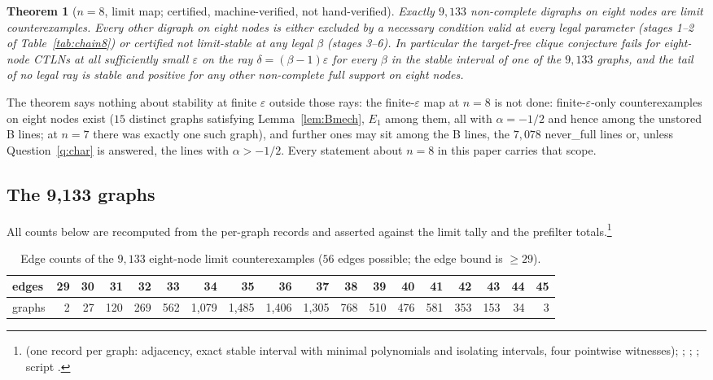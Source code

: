 \documentclass[11pt]{article}
\newtheorem{theorem}{Theorem}[section]
\theoremstyle{definition}
\newcommand{\eps}{\varepsilon}
\begin{document}
\begin{theorem}[$n=8$, limit map; certified, machine-verified, not hand-verified]\label{thm:n8}
Exactly $9{,}133$ non-complete digraphs on eight nodes are limit counterexamples. Every other digraph on eight nodes is
either excluded by a necessary condition valid at every legal parameter (stages 1--2 of Table~\ref{tab:chain8}) or
certified not limit-stable at any legal $\beta$ (stages 3--6). In particular the target-free clique conjecture fails for
eight-node CTLNs at all sufficiently small $\eps$ on the ray $\delta=(\beta-1)\eps$ for every $\beta$ in the stable
interval of one of the $9{,}133$ graphs, and the tail of no legal ray is stable and positive for any other non-complete
full support on eight nodes.
\end{theorem}
The theorem says nothing about stability at finite $\eps$ outside those rays: the finite-$\eps$ map at $n=8$ is not
done: finite-$\eps$-only counterexamples on eight nodes exist ($15$ distinct graphs satisfying Lemma~\ref{lem:Bmech}, $E_1$ among
them, all with $\alpha=-1/2$ and hence among the unstored B lines; at $n=7$ there was exactly one such graph), and further ones
may sit among the B lines, the $7{,}078$ never\_full lines or, unless Question~\ref{q:char} is answered, the lines with
$\alpha>-1/2$. Every statement about $n=8$ in this paper carries that scope.

\subsection{The 9,133 graphs}
All counts below are recomputed from the per-graph records and asserted against the limit tally and the prefilter
totals.\footnote{ (one record per graph: adjacency, exact stable interval with minimal
polynomials and isolating intervals, four pointwise witnesses); ;
; ; script
.}

\begin{table}[ht]
\centering
\footnotesize
\setlength{\tabcolsep}{3.4pt}
\begin{tabular}{@{}l*{17}{r}@{}}
\toprule
edges & 29 & 30 & 31 & 32 & 33 & 34 & 35 & 36 & 37 & 38 & 39 & 40 & 41 & 42 & 43 & 44 & 45\\
\midrule
graphs & 2 & 27 & 120 & 269 & 562 & 1{,}079 & 1{,}485 & 1{,}406 & 1{,}305 & 768 & 510 & 476 & 581 & 353 & 153 & 34 & 3\\
\bottomrule
\end{tabular}
\caption{Edge counts of the $9{,}133$ eight-node limit counterexamples ($56$ edges possible; the edge bound is $\ge29$).}\label{tab:n8edges}
\end{table}
\end{document}
